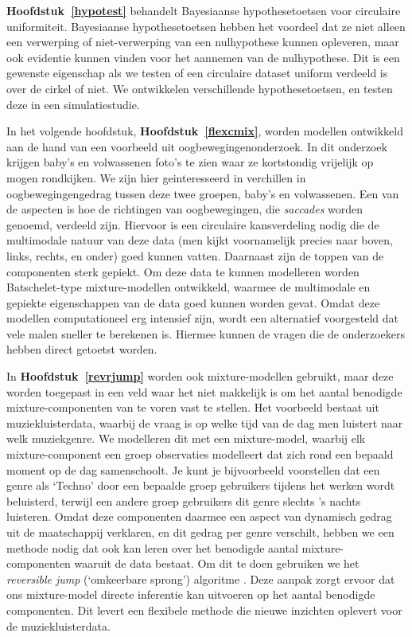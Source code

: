 \documentclass[12pt, a4paper]{book}\usepackage[]{graphicx}\usepackage{xcolor}
\begin{document}
\textbf{Hoofdstuk~\ref{hypotest}} behandelt Bayesiaanse hypothesetoetsen voor circulaire uniformiteit. Bayesiaanse hypothesetoetsen hebben het voordeel dat ze niet alleen een verwerping of niet-verwerping van een nulhypothese kunnen opleveren, maar ook evidentie kunnen vinden voor het aannemen van de nulhypothese. Dit is een gewenste eigenschap als we testen of een circulaire dataset uniform verdeeld is over de cirkel of niet. We ontwikkelen verschillende hypothesetoetsen, en testen deze in een simulatiestudie.

In het volgende hoofdstuk, \textbf{Hoofdstuk~\ref{flexcmix}}, worden modellen ontwikkeld aan de hand van een voorbeeld uit oogbewegingenonderzoek. In dit onderzoek krijgen baby's en volwassenen foto's te zien waar ze kortstondig vrijelijk op mogen rondkijken. We zijn hier geinteresseerd in verchillen in oogbewegingengedrag tussen deze twee groepen, baby's en volwassenen. Een van de aspecten is hoe de richtingen van oogbewegingen, die \textit{saccades} worden genoemd, verdeeld zijn. Hiervoor is een circulaire kansverdeling nodig die de multimodale natuur van deze data (men kijkt voornamelijk precies naar boven, links, rechts, en onder) goed kunnen vatten. Daarnaast zijn de toppen van de componenten sterk gepiekt. Om deze data te kunnen modelleren worden Batschelet-type mixture-modellen ontwikkeld, waarmee de multimodale en gepiekte eigenschappen van de data goed kunnen worden gevat. Omdat deze modellen computationeel erg intensief zijn, wordt een alternatief voorgesteld dat vele malen sneller te berekenen is. Hiermee kunnen de vragen die de onderzoekers hebben direct getoetst worden.

In \textbf{Hoofdstuk~\ref{revrjump}} worden ook mixture-modellen gebruikt, maar deze worden toegepast in een veld waar het niet makkelijk is om het aantal benodigde mixture-componenten van te voren vast te stellen. Het voorbeeld bestaat uit muziekluisterdata, waarbij de vraag is op welke tijd van de dag men luistert naar welk muziekgenre. We modelleren dit met een mixture-model, waarbij elk mixture-component een groep observaties modelleert dat zich rond een bepaald moment op de dag samenschoolt. Je kunt je bijvoorbeeld  voorstellen dat een genre als `Techno' door een bepaalde groep gebruikers tijdens het werken wordt beluisterd, terwijl een andere groep gebruikers dit genre slechts 's nachts luisteren. Omdat deze componenten daarmee een aspect van dynamisch gedrag uit de maatschappij verklaren, en dit gedrag per genre verschilt, hebben we een methode nodig dat ook kan leren over het benodigde aantal mixture-componenten waaruit de data bestaat. Om dit te doen gebruiken we het \textit{reversible jump} (`omkeerbare sprong') algoritme \citep{richardson1997bayesian}. Deze aanpak zorgt ervoor dat ons mixture-model directe inferentie kan uitvoeren op het aantal benodigde componenten. Dit levert een flexibele methode die nieuwe inzichten oplevert voor de muziekluisterdata.
\end{document}

